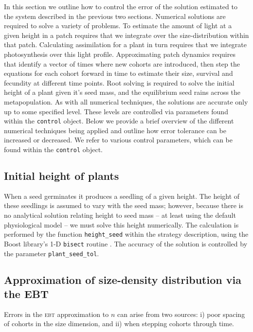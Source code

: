 \documentclass[10pt,twoside]{article}
\begin{document}
In this section we outline how to control the error of the solution
estimated to the system described in the previous two sections.
Numerical solutions are required to solve a variety of problems. To
estimate the amount of light at a given height in a patch requires that
we integrate over the size-distribution within that patch. Calculating
assimilation for a plant in turn requires that we integrate
photosynthesis over this light profile. Approximating patch dynamics
requires that identify a vector of times where new cohorts are
introduced, then step the equations for each cohort forward in time to
estimate their size, survival and fecundity at different time points.
Root solving is required to solve the initial height of a plant given
it's seed mass, and the equilibrium seed rains across the
metapopulation. As with all numerical techniques, the solutions are
accurate only up to some specified level. These levels are controlled
via parameters found within the \texttt{control} object. Below we
provide a brief overview of the different numerical techniques being
applied and outline how error tolerance can be increased or decreased. 
We refer to various control parameters, which can be found within the 
\texttt{control} object. 

\subsection{Initial height of plants}\label{initial-height-of-plants}

When a seed germinates it produces a seedling of a given height. The
height of these seedlings is assumed to vary with the seed mass;
however, because there is no analytical solution relating height to seed
mass -- at least using the default physiological model -- we must solve
this height numerically. The calculation is performed by the function
\texttt{height\_seed} within the strategy description, using the Boost
library's 1-D \texttt{bisect} routine
\citep{Schaling-2014, Eddelbuettel-2015}. The accuracy of the solution
is controlled by the parameter \texttt{plant\_seed\_tol}.

\subsection{Approximation of size-density distribution via the EBT}
\label{approximation-of-size-density-distribution-via-the-ebt}

Errors in the \textsc{ebt} approximation to \(n\) can arise from two sources: i)
poor spacing of cohorts in the size dimension, and ii) when stepping
cohorts through time.
\end{document}
